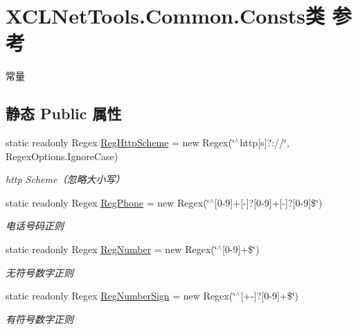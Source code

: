 \hypertarget{class_x_c_l_net_tools_1_1_common_1_1_consts}{}\section{X\+C\+L\+Net\+Tools.\+Common.\+Consts类 参考}
\label{class_x_c_l_net_tools_1_1_common_1_1_consts}


常量  


\subsection*{静态 Public 属性}
\begin{DoxyCompactItemize}
\item 
static readonly Regex \hyperlink{class_x_c_l_net_tools_1_1_common_1_1_consts_a86f2f516b20b37531db1c7bffea20087}{Reg\+Http\+Scheme} = new Regex(\char`\"{}$^\wedge$http\mbox{[}s\mbox{]}?\+://\char`\"{}, Regex\+Options.\+Ignore\+Case)
\begin{DoxyCompactList}\small\item\em http Scheme（忽略大小写） \end{DoxyCompactList}\item 
static readonly Regex \hyperlink{class_x_c_l_net_tools_1_1_common_1_1_consts_a031cd563beb9efff8d9a60f44575e995}{Reg\+Phone} = new Regex(\char`\"{}$^\wedge$\mbox{[}0-\/9\mbox{]}+\mbox{[}-\/\mbox{]}?\mbox{[}0-\/9\mbox{]}+\mbox{[}-\/\mbox{]}?\mbox{[}0-\/9\mbox{]}\$\char`\"{})
\begin{DoxyCompactList}\small\item\em 电话号码正则 \end{DoxyCompactList}\item 
static readonly Regex \hyperlink{class_x_c_l_net_tools_1_1_common_1_1_consts_a2b125c92012502b2cfc5ceb4c177d0c1}{Reg\+Number} = new Regex(\char`\"{}$^\wedge$\mbox{[}0-\/9\mbox{]}+\$\char`\"{})
\begin{DoxyCompactList}\small\item\em 无符号数字正则 \end{DoxyCompactList}\item 
static readonly Regex \hyperlink{class_x_c_l_net_tools_1_1_common_1_1_consts_a2308c79f4e3a26951f386e21c7132efc}{Reg\+Number\+Sign} = new Regex(\char`\"{}$^\wedge$\mbox{[}+-\/\mbox{]}?\mbox{[}0-\/9\mbox{]}+\$\char`\"{})
\begin{DoxyCompactList}\small\item\em 有符号数字正则 \end{DoxyCompactList}\item 

\end{DoxyCompactItemize}
